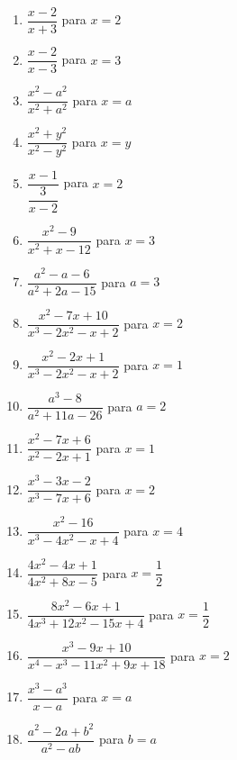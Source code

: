 \documentclass{article}
\begin{document}
\begin{enumerate}[label=\bfseries\small 139.\arabic*, itemsep=3cm]
\large


\item $\dfrac{x-2}{x+3}$ para $x = 2$

\item $\dfrac{x-2}{x-3}$ para $x = 3$

\item $\dfrac{x^2 - a^2}{x^2 + a^2}$ para $x = a$

\item $\dfrac{x^2 + y^2}{x^2 - y^2}$ para $x = y$

\item $\dfrac{x - 1}{\dfrac{3}{x - 2}}$ para $x = 2$ 

\item $\dfrac{x^2 - 9}{x^2 + x - 12}$ para $x = 3$

\item $\dfrac{a^2 - a - 6}{a^2 + 2a - 15}$ para $a = 3$

\item $\dfrac{x^2 - 7x + 10}{x^3 - 2x^2 - x + 2}$ para $x = 2$

\item $\dfrac{x^2 - 2x + 1}{x^3 - 2x^2 - x + 2}$ para $x = 1$

\item $\dfrac{a^3 - 8}{a^2 + 11a - 26}$ para $a = 2$

\item $\dfrac{x^2 - 7x + 6}{x^2 - 2x + 1}$ para $x = 1$

\item $\dfrac{x^3 - 3x - 2}{x^3 - 7x + 6}$ para $x = 2$

\item $\dfrac{x^2 - 16}{x^3 - 4x^2 - x + 4}$ para $x = 4$

\item $\dfrac{4x^2 - 4x + 1}{4x^2 + 8x - 5}$ para $x = \dfrac{1}{2}$

\item $\dfrac{8x^2 - 6x + 1}{4x^3 + 12x^2 - 15x + 4}$ para $x = \dfrac{1}{2}$

\item $\dfrac{x^3 - 9x + 10}{x^4 - x^3 - 11x^2 + 9x + 18}$ para $x = 2$

\item $\dfrac{x^3 - a^3}{x - a}$ para $x = a$

\item $\dfrac{a^2 - 2a + b^2}{a^2 - ab}$ para $b = a$


\end{enumerate}
\end{document}
